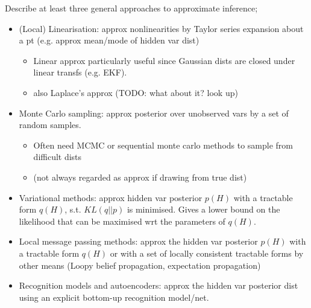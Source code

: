 \documentclass{article}
\begin{document}
Describe at least three general approaches to approximate inference; \begin{itemize}
    \item (Local) Linearisation: approx nonlinearities by Taylor series expansion about a pt (e.g. approx mean/mode of hidden var dist) \begin{itemize}
        \item Linear approx particularly useful since Gaussian dists are closed under linear transfs (e.g. EKF).
        \item also Laplace's approx (TODO: what about it? look up)
    \end{itemize}
    \item Monte Carlo sampling: approx posterior over unobserved vars by a set of random samples. \begin{itemize}
        \item Often need MCMC or sequential monte carlo methods to sample from difficult dists
        \item (not always regarded as approx if drawing from true dist)
    \end{itemize}
    \item Variational methods: approx hidden var posterior $p(H)$ with a tractable form $q(H)$, s.t. $KL(q||p)$ is minimised. Gives a lower bound on the likelihood that can be maximised wrt the parameters of $q(H)$.
    \item Local message passing methods: approx the hidden var posterior $p(H)$ with a tractable form $q(H)$ or with a set of locally consistent tractable forms by other means (Loopy belief propagation, expectation propagation)
    \item Recognition models and autoencoders: approx the hidden var posterior dist using an explicit bottom-up recognition model/net.
\end{itemize}
\end{document}
